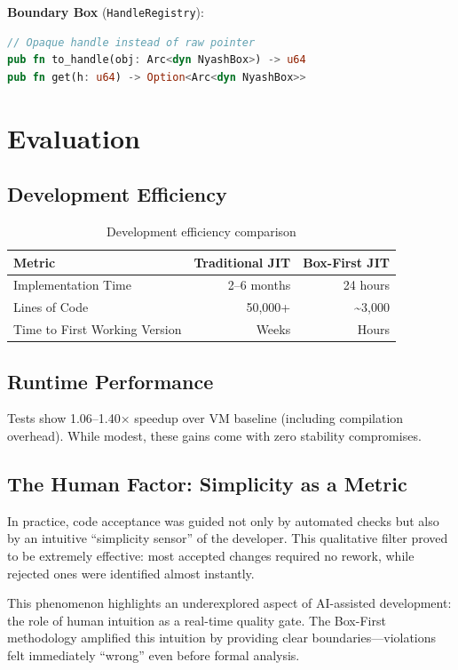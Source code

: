 \documentclass[10pt,conference]{IEEEtran}
\begin{document}
\textbf{Boundary Box} (\texttt{HandleRegistry}):
\begin{lstlisting}[language=Rust]
// Opaque handle instead of raw pointer
pub fn to_handle(obj: Arc<dyn NyashBox>) -> u64
pub fn get(h: u64) -> Option<Arc<dyn NyashBox>>
\end{lstlisting}

\section{Evaluation}

\subsection{Development Efficiency}

\begin{table}[h]
\centering
\begin{tabular}{|l|r|r|}
\hline
\textbf{Metric} & \textbf{Traditional JIT} & \textbf{Box-First JIT} \\
\hline
Implementation Time & 2--6 months & 24 hours \\
Lines of Code & 50,000+ & \textasciitilde3,000 \\
Time to First Working Version & Weeks & Hours \\
\hline
\end{tabular}
\caption{Development efficiency comparison}
\label{tab:efficiency}
\end{table}

\subsection{Runtime Performance}

Tests show 1.06--1.40× speedup over VM baseline (including compilation overhead). While modest, these gains come with zero stability compromises.

\subsection{The Human Factor: Simplicity as a Metric}

In practice, code acceptance was guided not only by automated checks but also by an intuitive ``simplicity sensor'' of the developer. This qualitative filter proved to be extremely effective: most accepted changes required no rework, while rejected ones were identified almost instantly.

This phenomenon highlights an underexplored aspect of AI-assisted development: the role of human intuition as a real-time quality gate. The Box-First methodology amplified this intuition by providing clear boundaries---violations felt immediately ``wrong'' even before formal analysis.
\end{document}
